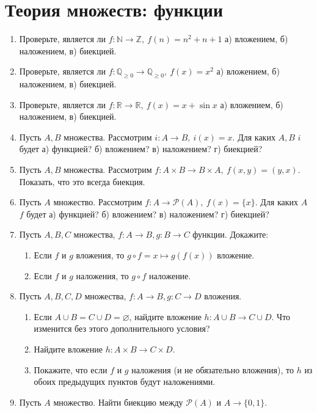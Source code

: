 \documentclass{article}
\newcommand{\N}{\mathbb{N}}
\newcommand{\Z}{\mathbb{Z}}
\newcommand{\Q}{\mathbb{Q}}
\newcommand{\R}{\mathbb{R}}
\begin{document}
\section{Теория множеств: функции}
\begin{enumerate}
    \item Проверьте, является ли $f: \N \to \Z,~f(n)=n^2+n+1$ а) вложением, б) наложением, в) биекцией.
    \item Проверьте, является ли $f: \Q_{\geq 0} \to \Q_{\geq 0},~f(x)=x^2$ а) вложением, б) наложением, в) биекцией.
    \item Проверьте, является ли $f: \R \to \R,~f(x)=x + \sin x$ а) вложением, б) наложением, в) биекцией.
    \item Пусть $A, B$ множества. Рассмотрим $i: A \to B,~i(x)=x$. Для каких $A,B$ $i$ будет а) функцией? б) вложением? в) наложением? г) биекцией?
    \item Пусть $A, B$ множества. Рассмотрим $f: A \times B \to B \times A,~f(x,y)=(y,x)$. Показать, что это всегда биекция.
    \item Пусть $A$ множество. Рассмотрим $f: A \to \mathcal{P}(A),~f(x)=\{x\}$. Для каких $A$ $f$ будет а) функцией? б) вложением? в) наложением? г) биекцией?
    \item Пусть $A,B,C$ множества, $f: A \to B, g: B \to C$ функции. Докажите:
        \begin{enumerate}
            \item Если $f$ и $g$ вложения, то $g \circ f = x \mapsto g(f(x))$ вложение.
            \item Если $f$ и $g$ наложения, то $g \circ f$ наложение.
        \end{enumerate}
    \item Пусть $A,B,C,D$ множества, $f: A \to B, g: C \to D$ вложения.
        \begin{enumerate}
            \item Если $A \cup B = C \cup D = \varnothing$, найдите вложение $h: A \cup B \to C \cup D$. Что изменится без этого дополнительного условия?
            \item Найдите вложение $h: A \times B \to C \times D$.
            \item Покажите, что если $f$ и $g$ наложения (и не обязательно вложения), то $h$ из обоих предыдущих пунктов будут наложениями.
        \end{enumerate}
    \item \label{h61} Пусть $A$ множество. Найти биекцию между $\mathcal{P}(A)$ и $A \to \{0,1\}$.

\end{enumerate}
\end{document}
